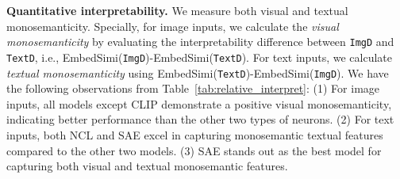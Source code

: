 \textbf{Quantitative interpretability.} We measure both visual and textual monosemanticity. Specially, for image inputs, we calculate the \textsl{visual monosemanticity} by evaluating the interpretability difference between \texttt{ImgD} and \texttt{TextD}, i.e., EmbedSimi(\texttt{ImgD})-EmbedSimi(\texttt{TextD}). For text inputs, we calculate \textsl{textual monosemanticity} using EmbedSimi(\texttt{TextD})-EmbedSimi(\texttt{ImgD}). We have the following observations from Table~\ref{tab:relative_interpret}: (1) For image inputs, all models except CLIP demonstrate a positive visual monosemanticity, indicating better performance than the other two types of neurons. (2) For text inputs, both NCL and SAE excel in capturing  monosemantic textual features compared to the other two models. (3) SAE stands out as the best model for capturing both visual and textual monosemantic features. 
\begin{table}[h]
\caption{The visual and textual monosemanticity. A higher value indicates that \texttt{ImgD} captures more visual than linguistic features, and vice versa for \texttt{TextD}. NCL and SAE prompts the modality-specific monosemanticity in both image and text. }
\label{tab:relative_interpret}
\end{table}

